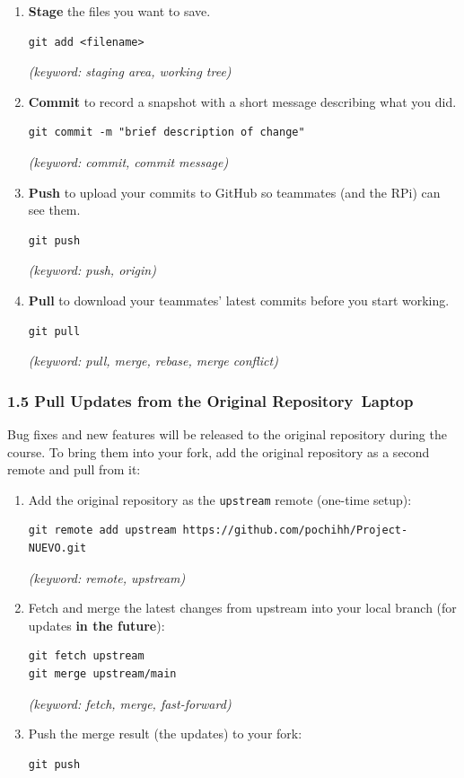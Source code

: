 \documentclass{ol-softwaremanual}
\newcommand{\onlaptop}{%
  \,\colorbox{green!25}{\footnotesize\sffamily\bfseries Laptop}}
\begin{document}
\begin{enumerate}
  \item \textbf{Stage} the files you want to save.
\begin{verbatim}
git add <filename>
\end{verbatim}
        \hfill\textit{(keyword: staging area, working tree)}

  \item \textbf{Commit} to record a snapshot with a short message describing what you did.
\begin{verbatim}
git commit -m "brief description of change"
\end{verbatim}
        \hfill\textit{(keyword: commit, commit message)}

  \item \textbf{Push} to upload your commits to GitHub so teammates (and the RPi) can see them.
\begin{verbatim}
git push
\end{verbatim}
        \hfill\textit{(keyword: push, origin)}

  \item \textbf{Pull} to download your teammates' latest commits before you start working.
\begin{verbatim}
git pull
\end{verbatim}
        \hfill\textit{(keyword: pull, merge, rebase, merge conflict)}
\end{enumerate}

\subsubsection*{1.5 Pull Updates from the Original Repository\onlaptop}

Bug fixes and new features will be released to the original repository during the
course.
To bring them into your fork, add the original repository as a second remote and
pull from it:

\begin{enumerate}
  \item Add the original repository as the \texttt{upstream} remote (one-time setup):
\begin{verbatim}
git remote add upstream https://github.com/pochihh/Project-NUEVO.git
\end{verbatim}
        \hfill\textit{(keyword: remote, upstream)}

  \item Fetch and merge the latest changes from upstream into your local branch (for updates \textbf{in the future}):
\begin{verbatim}
git fetch upstream
git merge upstream/main
\end{verbatim}
        \hfill\textit{(keyword: fetch, merge, fast-forward)}

  \item Push the merge result (the updates) to your fork:
\begin{verbatim}
git push
\end{verbatim}
\end{enumerate}
\end{document}
